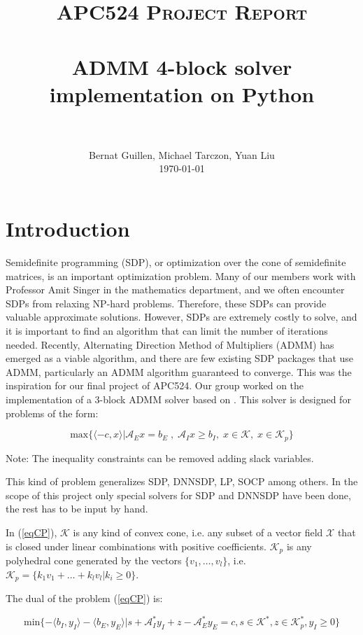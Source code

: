 \documentclass[paper=a4, fontsize=11pt]{scrartcl}
\title{
		\usefont{OT1}{bch}{b}{n}
		\normalfont \normalsize \textsc{APC524 Project Report} \\ [25pt]
		\horrule{0.5pt} \\[0.4cm]
		\huge ADMM 4-block solver implementation on Python \\
		\horrule{2pt} \\[0.5cm]
}
\author{
		\normalfont 								\normalsize
        Bernat Guillen, Michael Tarczon, Yuan Liu\\[-3pt]		\normalsize
        \today
}
\date{}
\numberwithin{equation}{section}		%
\numberwithin{figure}{section}			%
\numberwithin{table}{section}				%
\begin{document}
\maketitle
\section{Introduction}
Semidefinite programming (SDP), or optimization over the cone of semidefinite matrices, is an important optimization problem.  Many of our members work with Professor Amit Singer in the mathematics department, and we often encounter SDPs from relaxing NP-hard problems.  Therefore, these SDPs can provide valuable approximate solutions.  However, SDPs are extremely costly to solve, and it is important to find an algorithm that can limit the number of iterations needed.  Recently, Alternating Direction Method of Multipliers (ADMM) has emerged as a viable algorithm, and there are few existing SDP packages that use ADMM, particularly an ADMM algorithm guaranteed to converge.
This was the inspiration for our final project of APC524. Our group worked on the implementation of a 3-block ADMM solver based on \cite{sun2014}. This solver is designed for problems of the form:

\begin{equation}
\label{eqCP}
	\text{max}\{\langle -c,x\rangle | \mathcal{A}_E x = b_E\;,\;\mathcal{A}_I x\geq b_I, \;x\in \mathcal{K},\; x\in\mathcal{K}_p\}
\end{equation}

Note: The inequality constraints can be removed adding slack variables.

This kind of problem generalizes SDP, DNNSDP, LP, SOCP among others. In the scope of this project only special solvers for SDP and DNNSDP have been done, the rest has to be input by hand. 

In (\ref{eqCP}), $\mathcal{K}$ is any kind of convex cone, i.e. any subset of a vector field $\mathcal{X}$ that is closed under linear combinations with positive coefficients. $\mathcal{K}_p$ is any polyhedral cone generated by the vectors $\{v_1,\dots,v_l\}$, i.e. $\mathcal{K}_p = \{k_1v_1 + \dots + k_l v_l | k_i \geq 0\}$.

The dual of the problem (\ref{eqCP}) is:

\begin{equation}
\label{eqCPdual}
\text{min}\{-\langle b_I , y_I\rangle -\langle b_E , y_E\rangle | s + \mathcal{A}^{*}_{I} y_I + z - \mathcal{A}^{*}_{E} y_E = c, s\in \mathcal{K}^*, z \in \mathcal{K}_p^*, y_I \geq 0\}
\end{equation}
\end{document}
